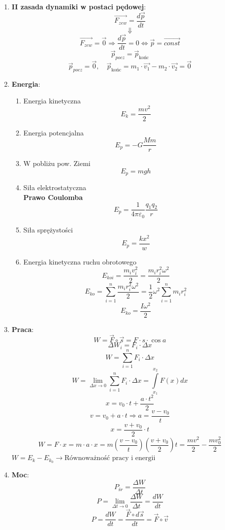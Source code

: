 \documentclass{article}
\begin{document}
\begin{enumerate}
		\item \textbf{II zasada dynamiki w postaci pędowej}:
		\[
		\overrightarrow{F_{zew}} = \frac{d \vec{p}}{dt}
		\]
		\[
		\Downarrow
		\]
		\[
		\overrightarrow{F_{zew}} = \vec{0} \Rightarrow \frac{d \vec{p}}{dt} = 0 \Leftrightarrow \vec{p} = \overrightarrow{const}
		\]
		\[
		\vec{p}_{pocz} = \vec{p}_{\text{końc}}
		\]
		\[
		\vec{p}_{pocz} = \vec{0}, \quad \vec{p}_{\text{końc}}= m_1 \cdotp \overrightarrow{v_1} - m_2 \cdotp \overrightarrow{v_2} = \vec{0}
		\]
		
		\item \textbf{Energia}:
		\begin{enumerate}
			\item Energia kinetyczna
			\[
			E_k = \frac{mv^2}{2}
			\]
			\item Energia potencjalna
			\[
			E_p = -G \frac{Mm}{r}
			\]
			\item W pobliżu pow. Ziemi
			\[
			E_p = mgh
			\]
			\item Siła elektrostatyczna \\
			\textbf{Prawo Coulomba}
			\[
			E_p = \frac{1}{4 \pi \varepsilon_0} \frac{q_1 q_2}{r}
			\]
			\item Siła sprężystości
			\[
			E_p = \frac{kx^2}{w}
			\]
			\item Energia kinetyczna ruchu obrotowego
			\[
			E_{koi} = \frac{m_i v_i^2}{2} = \frac{m_i r_i^2 \omega^2}{2}
			\]
			\[
			E_{ko} = \sum\limits_{i = 1}^n \frac{m_i r_i^2 \omega^2}{2} = \frac{1}{2} \omega^2 \sum\limits_{i = 1}^n m_i r_i^2
			\]
			\[
			E_{ko} = \frac{I \omega^2}{2}
			\]
		\end{enumerate}
		
		\item \textbf{Praca}:
		\[
		W = \vec{F} \circ \vec{s} = F \cdot s \cdot \cos a
		\]
		\[
		\Delta W_i = F_i \cdot \Delta x
		\]
		\[
		W = \sum\limits_{i = 1}^n F_i \cdot \Delta x
		\]
		\[
		W = \lim\limits_{\Delta x \rightarrow 0} \sum\limits_{i = 1}^n F_i \cdot \Delta x = \int\limits_{x_1}^{x_2} F(x)dx
		\]
		\[
		x = v_0 \cdot t + \frac{a \cdot t^2}{2}
		\]
		\[
		v = v_0 + a \cdot t \Rightarrow a = \frac{v - v_0}{t}
		\]
		\[
		x = \frac{v + v_0}{2} \cdot t
		\]
		\[
		W = F \cdot x = m \cdot a \cdot x = m \left( \frac{v - v_0}{t} \right) \left( \frac{v + v_0}{2} \right)t = \frac{mv^2}{2} - \frac{mv_0^2}{2}
		\]
		$
		W = E_k - E_{k_0} \longrightarrow \text{Równoważność pracy i energii}
		$
		
		\item \textbf{Moc}:
		\[
		P_{śr} = \frac{\Delta W}{\Delta t}
		\]
		\[
		P = \lim\limits_{\Delta t \rightarrow 0} \frac{\Delta W}{\Delta t} = \frac{dW}{dt}
		\]
		\[
		P = \frac{dW}{dt} = \frac{\vec{F} \circ d \vec{s}}{dt} = \vec{F} \circ \vec{v}
		\]
		

\end{enumerate}
\end{document}
